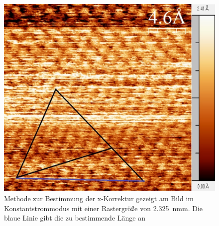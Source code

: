 \documentclass[12pt,a4paper]{article}
\begin{document}
\begin{figure}
\centering
\includegraphics[scale=0.5]{Bilder/Atome/strom2_h_scale.jpg}
\caption{Methode zur Bestimmung der x-Korrektur gezeigt am Bild im Konstantstrommodus mit einer Rastergröße von \SI{2,325}{nm}m. Die blaue Linie gibt die zu bestimmende Länge an}
\label{fig:strom2_h}
\end{figure}
\end{document}
